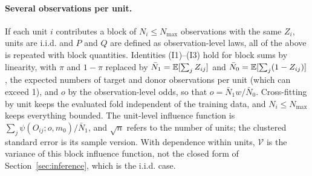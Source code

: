 \paragraph{Several observations per unit.} If each unit $i$ contributes a block of $N_i\le N_{\max}$ observations with the same $Z_i$, units are i.i.d. and $P$ and $Q$ are defined as observation-level laws, all of the above is repeated with block quantities. Identities (I1)--(I3) hold for block sums by linearity, with $\pi$ and $1-\pi$ replaced by $\bar N_1=\mathbb{E}[\sum_jZ_{ij}]$ and $\bar N_0=\mathbb{E}[\sum_j(1-Z_{ij})]$, the expected numbers of target and donor observations per unit (which can exceed 1), and $o$ by the observation-level odds, so that $o=\bar N_1w/\bar N_0$. Cross-fitting by unit keeps the evaluated fold independent of the training data, and $N_i\le N_{\max}$ keeps everything bounded. The unit-level influence function is $\sum_j\psi(O_{ij};o,m_0)/\bar N_1$, and $\sqrt n$ refers to the number of units; the clustered standard error is its sample version. With dependence within units, $\mathcal V$ is the variance of this block influence function, not the closed form of Section~\ref{sec:inference}, which is the i.i.d. case.
